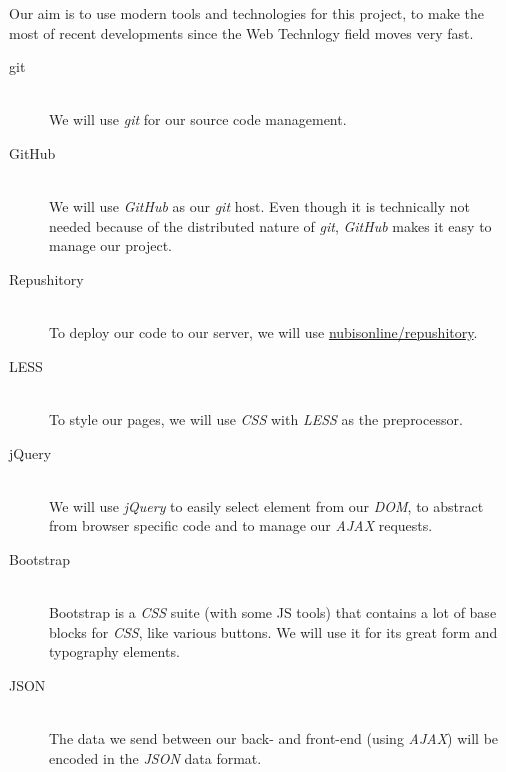 Our aim is to use modern tools and technologies for this project, to make the most of recent developments since the Web Technlogy field moves very fast.

\begin{description}
	\item[git]\hfill\\
		We will use \textit{git} for our source code management.
		
	\item[GitHub]\hfill\\
		We will use \textit{GitHub} as our \textit{git} host. Even though it is technically not needed because of the distributed nature of \textit{git}, \textit{GitHub} makes it easy to manage our project.
	
	\item[Repushitory]\hfill\\
		To deploy our code to our server, we will use \href{https://github.com/nubisonline/repushitory}{nubisonline/repushitory}.

	\item[LESS]\hfill\\
		To style our pages, we will use \textit{CSS} with \textit{LESS} as the preprocessor.

	\item[jQuery]\hfill\\
		We will use \textit{jQuery} to easily select element from our \textit{DOM}, to abstract from browser specific code and to manage our \textit{AJAX} requests.

	\item[Bootstrap]\hfill\\
		Bootstrap is a \textit{CSS} suite (with some JS tools) that contains a lot of base blocks for \textit{CSS}, like various buttons.
		We will use it for its great form and typography elements.

	\item[JSON]\hfill\\
		The data we send between our back- and front-end (using \textit{AJAX}) will be encoded in the \textit{JSON} data format.
\end{description}
